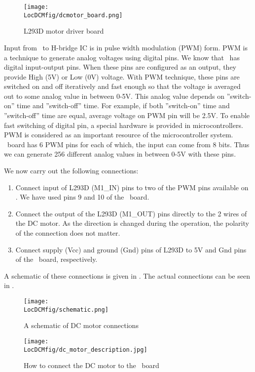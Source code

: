 \begin{figure}
\centering
\texttt{[image: \\LocDCMfig/dcmotor\_board.png]}
\caption{L293D motor driver board}
\label{fig:motordriverboard}
\end{figure}

Input from \arduino\ to H-bridge IC is in %
pulse width modulation (PWM) form. PWM is a technique to generate
analog voltages using digital pins. We know that \arduino\ has digital
input-output pins. When these pins are configured as an output, they
provide High (5V) or Low (0V) voltage. With PWM technique, these pins
are switched on and off iteratively and fast enough so that the
voltage is averaged out to some analog value in between 0-5V. This
analog value depends on ''switch-on'' time and ''switch-off''
time. For example, if both ''switch-on'' time and ''switch-off'' time
are equal, average voltage on PWM pin will be 2.5V. To enable fast
switching of digital pin, a special hardware is provided in
microcontrollers.  PWM is considered as an important resource of
the microcontroller system. \arduino\ board has 6 PWM pins for each of
which, the input can come from 8 bits.  Thus we can generate 256
different analog values in between 0-5V with these pins.

We now carry out the following connections:
\begin{enumerate}
\item Connect input of L293D (M1\_IN) pins to two of the PWM pins
  available on \arduino.  We have used pins 9 and 10 of the \arduino\
  board. 
\item Connect the output of the L293D (M1\_OUT) pins directly to the 2
  wires of the DC motor.  As the direction is changed during the
  operation, the polarity of the connection does not matter.
\item Connect supply (Vcc) and ground (Gnd) pins of L293D to 5V and
  Gnd pins of the \arduino\ board, respectively.
\end{enumerate}
A schematic of these connections is given in
.  The actual connections can be seen in
\figref{fig:dcmotorconn}.


\begin{figure}
\centering
\texttt{[image: \\LocDCMfig/schematic.png]}
\caption{A schematic of DC motor connections}
\label{fig:dcm-schematic}
\end{figure}
\begin{figure}
\centering
\texttt{[image: \\LocDCMfig/dc\_motor\_description.jpg]}
\caption{How to connect the DC motor to the \arduino\ board}
\label{fig:dcmotorconn}
\end{figure}


